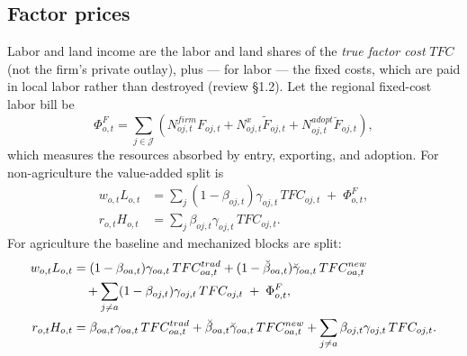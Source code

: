 \documentclass[11pt]{article}
\newcommand{\Sct}{\mathcal{J}}
\begin{document}
\subsection{Factor prices}
Labor and land income are the labor and land shares of the \emph{true factor cost}
$TFC$ (not the firm's private outlay), plus --- for labor --- the fixed costs, which are
paid in local labor rather than destroyed (review \S1.2). Let the regional fixed-cost labor
bill be
\begin{equation}
  \Phi^{F}_{o,t}
  = \sum_{j\in\Sct}\left(
      N^{firm}_{oj,t} F_{oj,t}
      + N^{x}_{oj,t} \tilde F_{oj,t}
      + N^{adopt}_{oj,t} \breve F_{oj,t}
    \right),
\end{equation}
which measures the resources absorbed by entry, exporting, and adoption. For
non-agriculture the value-added split is
\begin{align}
  w_{o,t} L_{o,t} &= \sum_j (1-\beta_{oj,t}) \gamma_{oj,t}\, TFC_{oj,t} \;+\; \Phi^{F}_{o,t}, \\
  r_{o,t} H_{o,t} &= \sum_j \beta_{oj,t} \gamma_{oj,t}\, TFC_{oj,t}.
\end{align}
For agriculture the baseline and mechanized blocks are split:
\begin{align}
  w_{o,t} L_{o,t}
  &=
  (1-\beta_{oa,t}) \gamma_{oa,t}\, TFC^{trad}_{oa,t}
  + (1-\breve\beta_{oa,t}) \breve\gamma_{oa,t}\, TFC^{new}_{oa,t} \notag\\
  &\quad
  + \sum_{j \ne a} (1-\beta_{oj,t}) \gamma_{oj,t}\, TFC_{oj,t}
  \;+\; \Phi^{F}_{o,t}, \\
  r_{o,t} H_{o,t}
  &=
  \beta_{oa,t} \gamma_{oa,t}\, TFC^{trad}_{oa,t}
  + \breve\beta_{oa,t} \breve\gamma_{oa,t}\, TFC^{new}_{oa,t}
  + \sum_{j \ne a} \beta_{oj,t} \gamma_{oj,t}\, TFC_{oj,t}.
\end{align}
\end{document}
